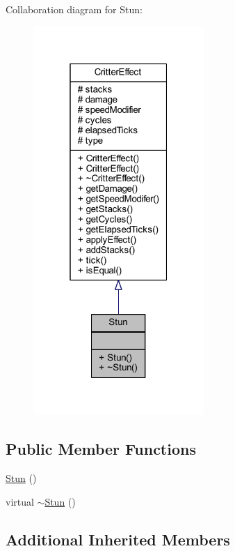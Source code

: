 Collaboration diagram for Stun\+:
\nopagebreak
\begin{figure}[H]
\begin{center}
\leavevmode
\includegraphics[width=184pt]{struct_stun__coll__graph}
\end{center}
\end{figure}
\subsection*{Public Member Functions}
\begin{DoxyCompactItemize}
\item 
\hyperlink{struct_stun_a99f94643774440019ec7f9238c5b0f17}{Stun} ()
\item 
virtual \hyperlink{struct_stun_a844edb4bce5c42768c5866edd009bf28}{$\sim$\+Stun} ()
\end{DoxyCompactItemize}
\subsection*{Additional Inherited Members}


